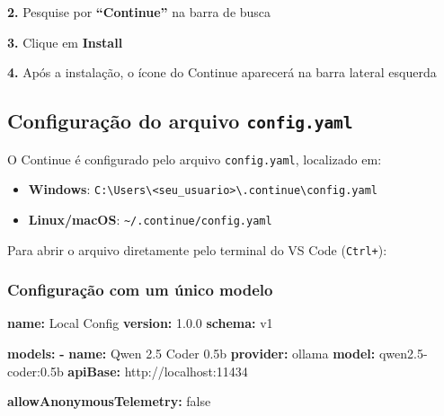 \documentclass[
]{article}
\newenvironment{Shaded}{\begin{snugshade}}{\end{snugshade}}
\newcommand{\AttributeTok}[1]{\textcolor[rgb]{0.13,0.29,0.53}{#1}}
\newcommand{\CharTok}[1]{\textcolor[rgb]{0.31,0.60,0.02}{#1}}
\newcommand{\CommentTok}[1]{\textcolor[rgb]{0.56,0.35,0.01}{\textit{#1}}}
\newcommand{\DataTypeTok}[1]{\textcolor[rgb]{0.13,0.29,0.53}{#1}}
\newcommand{\ExtensionTok}[1]{#1}
\newcommand{\FloatTok}[1]{\textcolor[rgb]{0.00,0.00,0.81}{#1}}
\newcommand{\FunctionTok}[1]{\textcolor[rgb]{0.13,0.29,0.53}{\textbf{#1}}}
\newcommand{\KeywordTok}[1]{\textcolor[rgb]{0.13,0.29,0.53}{\textbf{#1}}}
\newcommand{\NormalTok}[1]{#1}
\newcommand{\VariableTok}[1]{\textcolor[rgb]{0.00,0.00,0.00}{#1}}
\providecommand{\tightlist}{%
  \setlength{\itemsep}{0pt}\setlength{\parskip}{0pt}}
\begin{document}
\textbf{2.} Pesquise por \textbf{``Continue''} na barra de busca

\textbf{3.} Clique em \textbf{Install}

\textbf{4.} Após a instalação, o ícone do Continue aparecerá na barra
lateral esquerda

\subsection{\texorpdfstring{Configuração do arquivo
\texttt{config.yaml}}{Configuração do arquivo config.yaml}}\label{configurauxe7uxe3o-do-arquivo-config.yaml}

O Continue é configurado pelo arquivo \texttt{config.yaml}, localizado
em:

\begin{itemize}
\tightlist
\item
  \textbf{Windows}:
  \texttt{C:\textbackslash{}Users\textbackslash{}\textless{}seu\_usuario\textgreater{}\textbackslash{}.continue\textbackslash{}config.yaml}
\item
  \textbf{Linux/macOS}: \texttt{\textasciitilde{}/.continue/config.yaml}
\end{itemize}

Para abrir o arquivo diretamente pelo terminal do VS Code
(\texttt{Ctrl+}):

\begin{Shaded}
\end{Shaded}

\subsubsection{Configuração com um único
modelo}\label{configurauxe7uxe3o-com-um-uxfanico-modelo}

\begin{Shaded}
\begin{Highlighting}[]
\FunctionTok{name}\KeywordTok{:}\AttributeTok{ Local Config}
\FunctionTok{version}\KeywordTok{:}\AttributeTok{ }\FloatTok{1.0.0}
\FunctionTok{schema}\KeywordTok{:}\AttributeTok{ v1}

\FunctionTok{models}\KeywordTok{:}
\AttributeTok{  }\KeywordTok{{-}}\AttributeTok{ }\FunctionTok{name}\KeywordTok{:}\AttributeTok{ Qwen 2.5 Coder 0.5b}
\AttributeTok{    }\FunctionTok{provider}\KeywordTok{:}\AttributeTok{ ollama}
\AttributeTok{    }\FunctionTok{model}\KeywordTok{:}\AttributeTok{ qwen2.5{-}coder:0.5b}
\AttributeTok{    }\FunctionTok{apiBase}\KeywordTok{:}\AttributeTok{ http://localhost:11434}

\FunctionTok{allowAnonymousTelemetry}\KeywordTok{:}\AttributeTok{ }\CharTok{false}
\end{Highlighting}
\end{Shaded}
\end{document}

